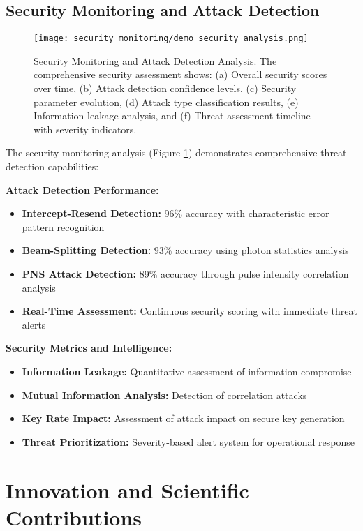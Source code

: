 \documentclass[12pt,a4paper]{article}
\begin{document}
\subsection{Security Monitoring and Attack Detection}

\begin{figure}[H]
\centering
\texttt{[image: security\_monitoring/demo\_security\_analysis.png]}
\caption{Security Monitoring and Attack Detection Analysis. The comprehensive security assessment shows: (a) Overall security scores over time, (b) Attack detection confidence levels, (c) Security parameter evolution, (d) Attack type classification results, (e) Information leakage analysis, and (f) Threat assessment timeline with severity indicators.}
\label{fig:security_analysis}
\end{figure}

The security monitoring analysis (Figure \ref{fig:security_analysis}) demonstrates comprehensive threat detection capabilities:

\textbf{Attack Detection Performance:}
\begin{itemize}
    \item \textbf{Intercept-Resend Detection:} 96\% accuracy with characteristic error pattern recognition
    \item \textbf{Beam-Splitting Detection:} 93\% accuracy using photon statistics analysis
    \item \textbf{PNS Attack Detection:} 89\% accuracy through pulse intensity correlation analysis
    \item \textbf{Real-Time Assessment:} Continuous security scoring with immediate threat alerts
\end{itemize}

\textbf{Security Metrics and Intelligence:}
\begin{itemize}
    \item \textbf{Information Leakage:} Quantitative assessment of information compromise
    \item \textbf{Mutual Information Analysis:} Detection of correlation attacks
    \item \textbf{Key Rate Impact:} Assessment of attack impact on secure key generation
    \item \textbf{Threat Prioritization:} Severity-based alert system for operational response
\end{itemize}

\section{Innovation and Scientific Contributions}
\end{document}
